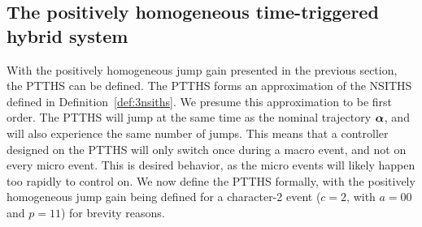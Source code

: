\documentclass[../DC2019003Bouma.tex]{subfiles}
\begin{document}
\subsection{The positively homogeneous time-triggered hybrid system}\label{def:4PTTHS}
With the positively homogeneous jump gain presented in the previous section, the PTTHS can be defined. The PTTHS forms an approximation of the NSITHS defined in Definition~\ref{def:3nsiths}. We presume this approximation to be first order. The PTTHS will jump at the same time as the nominal trajectory $\boldsymbol{\alpha}$, and will also experience the same number of jumps. This means that a controller designed on the PTTHS will only switch once during a macro event, and not on every micro event. This is desired behavior, as the micro events will likely happen too rapidly to control on. We now define the PTTHS formally, with the positively homogeneous jump gain being defined for a character-2 event ($c = 2$, with $a = 00$ and $p=11$) for brevity reasons.
\end{document}
